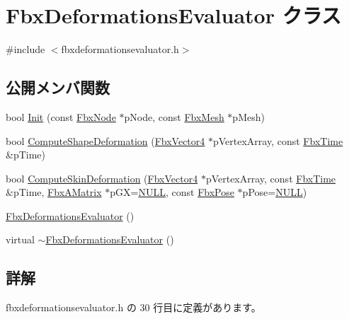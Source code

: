 \hypertarget{class_fbx_deformations_evaluator}{}\section{Fbx\+Deformations\+Evaluator クラス}
\label{class_fbx_deformations_evaluator}


{\ttfamily \#include $<$fbxdeformationsevaluator.\+h$>$}

\subsection*{公開メンバ関数}
\begin{DoxyCompactItemize}
\item 
bool \hyperlink{class_fbx_deformations_evaluator_aab3ae3fd2e05c1f34d19940030bd94ed}{Init} (const \hyperlink{class_fbx_node}{Fbx\+Node} $\ast$p\+Node, const \hyperlink{class_fbx_mesh}{Fbx\+Mesh} $\ast$p\+Mesh)
\item 
bool \hyperlink{class_fbx_deformations_evaluator_a7f2053ca983b26ba4991c71663b25778}{Compute\+Shape\+Deformation} (\hyperlink{class_fbx_vector4}{Fbx\+Vector4} $\ast$p\+Vertex\+Array, const \hyperlink{class_fbx_time}{Fbx\+Time} \&p\+Time)
\item 
bool \hyperlink{class_fbx_deformations_evaluator_a0bd5a2a85b36ff78be4739de7cc9918e}{Compute\+Skin\+Deformation} (\hyperlink{class_fbx_vector4}{Fbx\+Vector4} $\ast$p\+Vertex\+Array, const \hyperlink{class_fbx_time}{Fbx\+Time} \&p\+Time, \hyperlink{class_fbx_a_matrix}{Fbx\+A\+Matrix} $\ast$p\+GX=\hyperlink{fbxarch_8h_a070d2ce7b6bb7e5c05602aa8c308d0c4}{N\+U\+LL}, const \hyperlink{class_fbx_pose}{Fbx\+Pose} $\ast$p\+Pose=\hyperlink{fbxarch_8h_a070d2ce7b6bb7e5c05602aa8c308d0c4}{N\+U\+LL})
\item 
\hyperlink{class_fbx_deformations_evaluator_a58c875ccc032e63839063f2866f35d46}{Fbx\+Deformations\+Evaluator} ()
\item 
virtual \hyperlink{class_fbx_deformations_evaluator_a1bcc75f8ee488dbddc55456292f227b3}{$\sim$\+Fbx\+Deformations\+Evaluator} ()
\end{DoxyCompactItemize}


\subsection{詳解}


 fbxdeformationsevaluator.\+h の 30 行目に定義があります。



